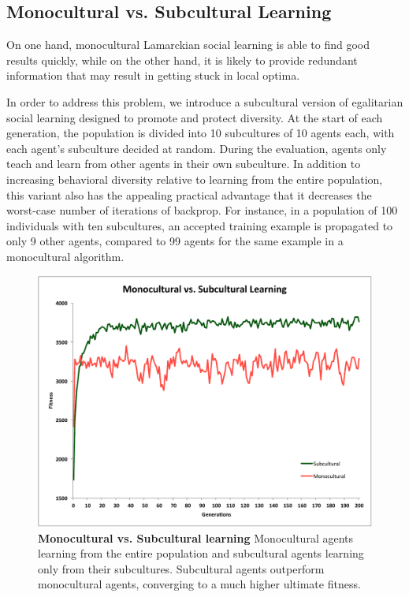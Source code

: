 \documentclass{sig-alternate}
\begin{document}
\subsection{Monocultural vs. Subcultural Learning}
On one hand, monocultural Lamarckian social learning is able to find good results quickly, while on the other hand, it is likely to provide redundant information that may result in getting stuck in local optima.  

In order to address this problem, we introduce a subcultural version of egalitarian social learning designed to promote and protect diversity. At the start of each generation, the population is divided into 10 subcultures of 10 agents each, with each agent's subculture decided at random. During the evaluation, agents only teach and learn from other agents in their own subculture. In addition to increasing behavioral diversity relative to learning from the entire population, this variant also has the appealing practical advantage that it decreases the worst-case number of iterations of backprop. For instance, in a population of 100 individuals with ten subcultures, an accepted training example is propagated to only 9 other agents, compared to 99 agents for the same example in a monocultural algorithm.

\begin{figure}
  \centering
    \includegraphics[scale=.41]{monocultural_vs_subcultural_learning.pdf}
  \caption{\textbf{Monocultural vs. Subcultural learning} Monocultural agents learning from the entire population and subcultural agents learning only from their subcultures.  Subcultural agents outperform monocultural agents, converging to a much higher ultimate fitness.}
  \label{fig:population-social}
\end{figure}
\end{document}
